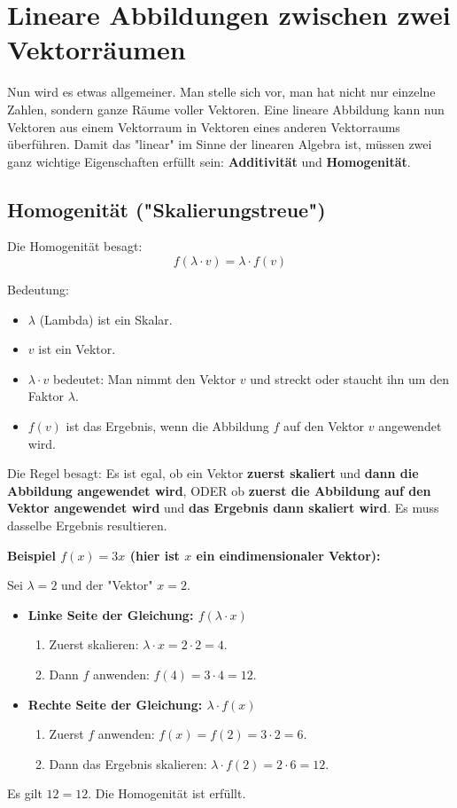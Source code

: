 \section{Lineare Abbildungen zwischen zwei Vektorräumen}

Nun wird es etwas allgemeiner. Man stelle sich vor, man hat nicht nur einzelne
Zahlen, sondern ganze Räume voller Vektoren. Eine lineare Abbildung kann nun
Vektoren aus einem Vektorraum in Vektoren eines anderen Vektorraums überführen.
Damit das "linear" im Sinne der linearen Algebra ist, müssen zwei ganz wichtige
Eigenschaften erfüllt sein: \textbf{Additivität} und \textbf{Homogenität}.

\subsection{Homogenität ("Skalierungstreue")}

Die Homogenität besagt: $$f(\lambda \cdot v) = \lambda \cdot f(v)$$

Bedeutung:
\begin{itemize}
    \item $\lambda$ (Lambda) ist ein Skalar.
    \item $v$ ist ein Vektor.
    \item $\lambda \cdot v$ bedeutet: Man nimmt den Vektor $v$ und streckt oder staucht ihn um den Faktor $\lambda$.
    \item $f(v)$ ist das Ergebnis, wenn die Abbildung $f$ auf den Vektor $v$ angewendet wird.
\end{itemize}
Die Regel besagt: Es ist egal, ob ein Vektor \textbf{zuerst skaliert} und \textbf{dann die Abbildung angewendet wird}, ODER ob \textbf{zuerst die Abbildung auf den Vektor angewendet wird} und \textbf{das Ergebnis dann skaliert wird}. Es muss dasselbe Ergebnis resultieren.

\textbf{Beispiel $f(x) = 3x$ (hier ist $x$ ein eindimensionaler Vektor):}

Sei $\lambda = 2$ und der "Vektor" $x=2$.
\begin{itemize}
    \item \textbf{Linke Seite der Gleichung: $f(\lambda \cdot x)$}
          \begin{enumerate}
              \item Zuerst skalieren: $\lambda \cdot x = 2 \cdot 2 = 4$.
              \item Dann $f$ anwenden: $f(4) = 3 \cdot 4 = 12$.
          \end{enumerate}
    \item \textbf{Rechte Seite der Gleichung: $\lambda \cdot f(x)$}
          \begin{enumerate}
              \item Zuerst $f$ anwenden: $f(x) = f(2) = 3 \cdot 2 = 6$.
              \item Dann das Ergebnis skalieren: $\lambda \cdot f(2) = 2 \cdot 6 = 12$.
          \end{enumerate}
\end{itemize}
Es gilt $12 = 12$. Die Homogenität ist erfüllt.

